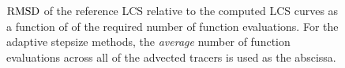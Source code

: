\begin{figure}[htpb]
    \centering
        
    \caption[$\rmsd$ of the reference LCS relative to the computed LCS
    curves relative a function of the required number of function evaluations]
    {$\rmsd$ of the reference LCS relative to the computed LCS curves as a
        function of of the required number of function evaluations. For the
        adaptive stepsize methods, the \emph{average} number of function
    evaluations across all of the advected tracers is used as the abscissa.}
    \label{fig:lcs_rmsd_fn_nn_both}
\end{figure}

